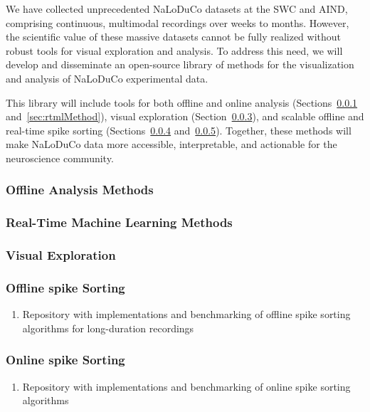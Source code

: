 We have collected unprecedented NaLoDuCo datasets at the SWC and AIND,
comprising continuous, multimodal recordings over weeks to months. However, the
scientific value of these massive datasets cannot be fully realized without
robust tools for visual exploration and analysis. To address this need, we will
develop and disseminate an open-source library of methods for the visualization
and analysis of NaLoDuCo experimental data.

This library will include tools for both offline and online analysis
(Sections~\ref{sec:offlineAnalysisMethods}
and~\ref{sec:rtmlMethod}), visual exploration
(Section~\ref{sec:visualExploration}), and scalable offline and real-time spike
sorting (Sections~\ref{sec:offlineSpikeSorting}
and~\ref{sec:onlineSpikeSorting}). Together, these methods will make NaLoDuCo
data more accessible, interpretable, and actionable for the neuroscience
community.

\subsubsection{Offline Analysis Methods}
\label{sec:offlineAnalysisMethods}



\subsubsection{Real-Time Machine Learning Methods}
\label{sec:rtmlMethods}



\subsubsection{Visual Exploration}
\label{sec:visualExploration}



\subsubsection{Offline spike Sorting}
\label{sec:offlineSpikeSorting}


\begin{enumerate}

    \item Repository with implementations and benchmarking of offline spike
        sorting algorithms for long-duration recordings

\end{enumerate}

\subsubsection{Online spike Sorting}
\label{sec:onlineSpikeSorting}


\begin{enumerate}

    \item Repository with implementations and benchmarking of online spike
        sorting algorithms

\end{enumerate}

